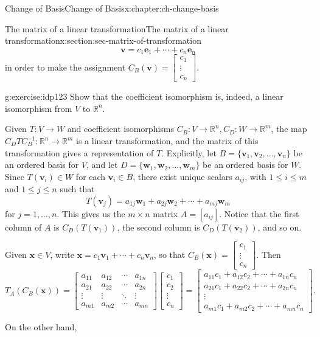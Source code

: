 \documentclass[oneside,10pt,]{book}
\numberwithin{equation}{section}
\newcommand{\bbm}{\begin{bmatrix}}
\newcommand{\ebm}{\end{bmatrix}}
\newcommand{\R}{\mathbb{R}}
\newcommand{\vv}{\mathbf{v}}
\newcommand{\ww}{\mathbf{w}}
\newcommand{\xx}{\mathbf{x}}
\newcommand{\basis}[2]{\{\mathbf{#1}_1,\mathbf{#1}_2,\ldots,\mathbf{#1}_{#2}\}}
\newcommand{\amp}{&}
\begin{document}
\begin{chapterptx}{Change of Basis}{}{Change of Basis}{}{}{x:chapter:ch-change-basis}
\begin{sectionptx}{The matrix of a linear transformation}{}{The matrix of a linear transformation}{}{}{x:section:sec-matrix-of-transformation}
\begin{equation*}
\vv = c_1\mathbf{e}_1+\cdots +c_n\mathbf{e}_n
\end{equation*}
in order to make the assignment \(C_B(\vv) = \bbm c_1\\\vdots \\c_n\ebm\).%
\begin{inlineexercise}{}{g:exercise:idp123}%
Show that the coefficient isomorphism is, indeed, a linear isomorphism from \(V\) to \(\R^n\).%
\end{inlineexercise}%
Given \(T:V\to W\) and coefficient isomorphisms \(C_B:V\to \R^n, C_D:W\to \R^m\), the map \(C_DTC_B^{-1}:\R^n\to \R^m\) is a linear transformation, and the matrix of this transformation gives a representation of \(T\). Explicitly, let \(B = \basis{v}{n}\) be an ordered basis for \(V\), and let \(D=\basis{w}{m}\) be an ordered basis for \(W\). Since \(T(\vv_i)\in W\) for each \(\vv_i\in B\), there exist unique scalars \(a_{ij}\), with \(1\leq i\leq m\) and \(1\leq j\leq n\) such that%
\begin{equation*}
T(\vv_j) = a_{1j}\ww_1+a_{2j}\ww_2+\cdots + a_{mj}\ww_m
\end{equation*}
for \(j=1,\ldots, n\). This gives us the \(m\times n\) matrix \(A = [a_{ij}]\). Notice that the first column of \(A\) is \(C_D(T(\vv_1))\), the second column is \(C_D(T(\vv_2))\), and so on.%
\par
Given \(\xx\in V\), write \(\xx = c_1\vv_1+\cdots + c_n\vv_n\), so that \(C_B(\xx) = \bbm c_1\\\vdots \\c_n\ebm\). Then%
\begin{equation*}
T_A(C_B(\xx)) = \bbm a_{11}\amp a_{12} \amp \cdots \amp a_{1n}\\
a_{21}\amp a_{22} \amp \cdots \amp a_{2n}\\
\vdots \amp \vdots \amp \ddots \amp \vdots\\
a_{m1}\amp a_{m2} \amp \cdots \amp a_{mn}\ebm\bbm c_1\\c_2\\ \vdots \\c_n\ebm
= \bbm a_{11}c_1+a_{12}c_2+\cdots +a_{1n}c_n\\
a_{21}c_1+a_{22}c_2+\cdots +a_{2n}c_n\\
\vdots\\
a_{m1}c_1+a_{m2}c_2+\cdots +a_{mn}c_n\ebm\text{.}
\end{equation*}
%
\par
On the other hand,%
\begin{align*}

\end{align*}
\end{sectionptx}
\end{chapterptx}
\end{document}
